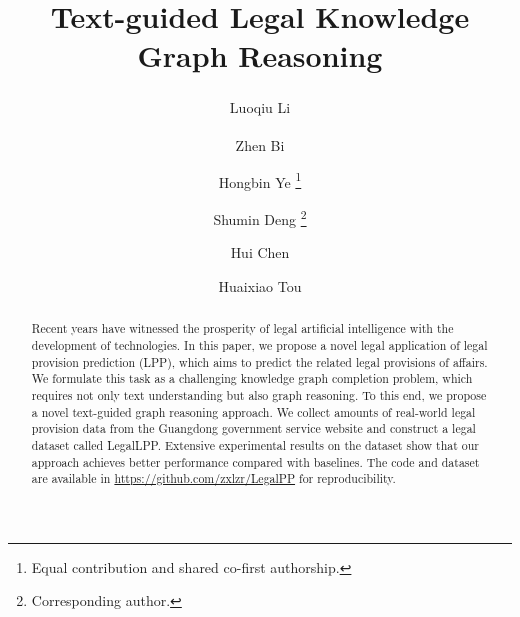 \documentclass[runningheads]{llncs}
\makeatletter
\newcommand{\printfnsymbol}[1]{%
  \textsuperscript{\@fnsymbol{#1}}%
}
\makeatother
\begin{document}
%
\title{Text-guided Legal Knowledge Graph Reasoning}
%
%
 
\author{Luoqiu Li\printfnsymbol{1}
\and Zhen Bi \printfnsymbol{1}
\and Hongbin Ye \thanks{Equal contribution and shared co-first authorship.}
\and Shumin Deng \thanks{Corresponding author.}
\and Hui Chen 
\and Huaixiao Tou
}
%
 
%
\maketitle              %
%
\begin{abstract}

Recent years have witnessed the prosperity of legal artificial intelligence with the development of technologies. In this paper, we propose a novel legal application of legal provision prediction (LPP), which aims to predict the related legal provisions of affairs. We formulate this task as a challenging knowledge graph completion problem, which requires not only text understanding but also graph reasoning. To this end, we propose a novel text-guided graph reasoning approach. We collect amounts of real-world legal provision data from the Guangdong government service website and construct a  legal dataset called LegalLPP. Extensive experimental results on the dataset show that our approach achieves better performance compared with baselines.  The code and dataset are available in \url{https://github.com/zxlzr/LegalPP} for reproducibility.
\end{abstract}
\end{document}
